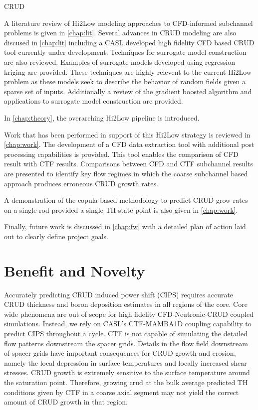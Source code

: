 CRUD 

A literature review of Hi2Low modeling approaches to CFD-informed subchannel
problems is given in \autoref{chap:lit}.  Several advances in CRUD modeling are
also discused in \autoref{chap:lit} including a CASL developed high fidelity
CFD based CRUD tool currently under development.
Techniques for surrogate model construction are also reviewed.  Examples of
surrogate models developed using regression kriging are provided.  These
techniques are highly relevent to the current Hi2Low problem as these models
seek to describe the behavior of random fields given a sparse set of inputs.
Additionally a review
of the gradient boosted algorithm and applications to surrogate model construction
are provided.

In \autoref{chap:theory}, the overarching Hi2Low pipeline is introduced.  

Work that has been performed in support of this Hi2Low strategy is reviewed in
\autoref{chap:work}.  The development of a CFD data extraction tool with
additional post processing capabilities is provided.  This tool enables the
comparison of CFD result with CTF results.  Comparisons between CFD and CTF
subchannel results are presented to identify key flow regimes in which the
coarse subchannel based approach produces erroneous CRUD growth rates.

A demonstration of the copula based methodology to predict CRUD grow rates on a
single rod provided a single TH state point is also given in
\autoref{chap:work}.

Finally, future work is discussed in \autoref{chap:fw} with a detailed plan of
action laid out to clearly define project goals.

\section{Benefit and Novelty}

Accurately predicting CRUD induced power shift (CIPS) requires accurate CRUD
thickness and boron deposition estimates in all regions of the core.  Core wide
phenomena are out of scope for high fidelity CFD-Neutronic-CRUD coupled
simulations.  Instead, we rely on CASL's CTF-MAMBA1D coupling capability to
predict CIPS throughout a cycle.  CTF is not capable of simulating the detailed
flow patterns downstream the spacer grids.  Details in the flow field
downstream of spacer grids have important consequences for CRUD growth and
erosion, namely the local depression in surface temperatures and locally
increased shear stresses.  CRUD growth is extremely sensitive to the surface
temperature around the saturation point.  Therefore, growing crud at the bulk
average predicted TH conditions given by CTF in a coarse axial segment may not
yield the correct amount of CRUD growth in that region.


